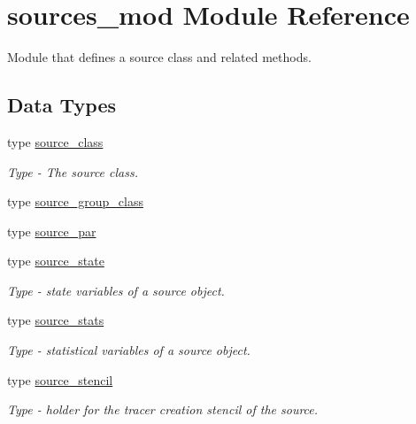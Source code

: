 \hypertarget{namespacesources__mod}{}\section{sources\+\_\+mod Module Reference}
\label{namespacesources__mod}


Module that defines a source class and related methods.  


\subsection*{Data Types}
\begin{DoxyCompactItemize}
\item 
type \hyperlink{structsources__mod_1_1source__class}{source\+\_\+class}
\begin{DoxyCompactList}\small\item\em Type -\/ The source class. \end{DoxyCompactList}\item 
type \hyperlink{structsources__mod_1_1source__group__class}{source\+\_\+group\+\_\+class}
\item 
type \hyperlink{structsources__mod_1_1source__par}{source\+\_\+par}
\item 
type \hyperlink{structsources__mod_1_1source__state}{source\+\_\+state}
\begin{DoxyCompactList}\small\item\em Type -\/ state variables of a source object. \end{DoxyCompactList}\item 
type \hyperlink{structsources__mod_1_1source__stats}{source\+\_\+stats}
\begin{DoxyCompactList}\small\item\em Type -\/ statistical variables of a source object. \end{DoxyCompactList}\item 
type \hyperlink{structsources__mod_1_1source__stencil}{source\+\_\+stencil}
\begin{DoxyCompactList}\small\item\em Type -\/ holder for the tracer creation stencil of the source. \end{DoxyCompactList}\end{DoxyCompactItemize}
